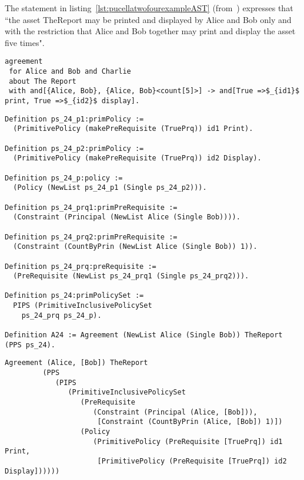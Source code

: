 %


The statement in listing~\ref{lst:pucellatwofourexampleAST} (from~\cite{pucella2006}) expresses that ``the asset TheReport may be printed and displayed by Alice and Bob only and with the restriction that Alice and Bob together may print and display the asset five times".

\lstset{language=Pucella2006}
\begin{minipage}[c]{0.95\textwidth}
\begin{lstlisting}[frame=single, caption={Agreement of Example 2.4}, label={lst:pucellatwofourexampleAST}, mathescape]
agreement
 for Alice and Bob and Charlie
 about The Report 
 with and[{Alice, Bob}, {Alice, Bob}<count[5]>] -> and[True =>$_{id1}$ print, True =>$_{id2}$ display].
\end{lstlisting}
\end{minipage} 

\begin{minipage}[c]{0.95\textwidth}
\begin{lstlisting}
Definition ps_24_p1:primPolicy := 
  (PrimitivePolicy (makePreRequisite (TruePrq)) id1 Print).

Definition ps_24_p2:primPolicy := 
  (PrimitivePolicy (makePreRequisite (TruePrq)) id2 Display).

Definition ps_24_p:policy := 
  (Policy (NewList ps_24_p1 (Single ps_24_p2))).

Definition ps_24_prq1:primPreRequisite := 
  (Constraint (Principal (NewList Alice (Single Bob)))).

Definition ps_24_prq2:primPreRequisite := 
  (Constraint (CountByPrin (NewList Alice (Single Bob)) 1)).
 
Definition ps_24_prq:preRequisite := 
  (PreRequisite (NewList ps_24_prq1 (Single ps_24_prq2))).

Definition ps_24:primPolicySet :=
  PIPS (PrimitiveInclusivePolicySet
    ps_24_prq ps_24_p).

Definition A24 := Agreement (NewList Alice (Single Bob)) TheReport (PPS ps_24).
\end{lstlisting}
\end{minipage} 

\begin{minipage}[c]{0.95\textwidth}
\begin{lstlisting}
Agreement (Alice, [Bob]) TheReport
         (PPS
            (PIPS
               (PrimitiveInclusivePolicySet
                  (PreRequisite
                     (Constraint (Principal (Alice, [Bob])),
                      [Constraint (CountByPrin (Alice, [Bob]) 1)])
                  (Policy
                     (PrimitivePolicy (PreRequisite [TruePrq]) id1 Print,
                      [PrimitivePolicy (PreRequisite [TruePrq]) id2 Display])))))

\end{lstlisting}
\end{minipage} 

